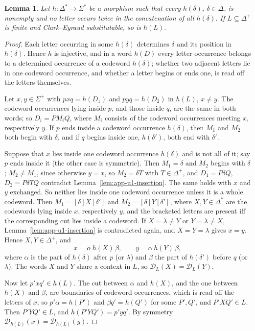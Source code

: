 \documentclass[11pt]{article}
\numberwithin{equation}{section}
\theoremstyle{plain}
\newtheorem{lemma}[theorem]{Lemma}
\theoremstyle{definition}
\theoremstyle{remark}
\theoremstyle{plain}
\newcommand{\D}{\mathcal{D}}
\newcommand{\eps}{\lambda}
\begin{document}
\begin{lemma}\label{lem:app-u1-code}
Let $h:\Delta^*\to\Sigma^*$ be a morphism such that every $h(\delta)$,
$\delta\in\Delta$, is nonempty and no letter occurs twice in the concatenation of
all $h(\delta)$.  If $L\subseteq\Delta^+$ is finite and Clark--Eyraud
substitutable, so is $h(L)$.
\end{lemma}

\begin{proof}
Each letter occurring in some $h(\delta)$ determines $\delta$ and its position in
$h(\delta)$.  Hence $h$ is injective, and in a word $h(D)$ every letter occurrence
belongs to a determined occurrence of a codeword $h(\delta)$; whether two adjacent
letters lie in one codeword occurrence, and whether a letter begins or ends one,
is read off the letters themselves.

Let $x,y\in\Sigma^+$ with $pxq=h(D_1)$ and $pyq=h(D_2)$ in $h(L)$, $x\ne y$.  The
codeword occurrences lying inside $p$, and those inside $q$, are the same in both
words; so $D_i=PM_iQ$, where $M_i$ consists of the codeword occurrences meeting
$x$, respectively $y$.  If $p$ ends inside a codeword occurrence $h(\delta)$, then
$M_1$ and $M_2$ both begin with $\delta$, and if $q$ begins inside one,
$h(\delta')$, both end with $\delta'$.

Suppose that $x$ lies inside one codeword occurrence $h(\delta)$ and is not all
of it; say $p$ ends inside it (the other case is symmetric).  Then $M_1=\delta$
and $M_2$ begins with $\delta$; $M_2\ne M_1$, since otherwise $y=x$, so
$M_2=\delta T$ with $T\in\Delta^+$, and $D_1=P\delta Q$, $D_2=P\delta TQ$ contradict
Lemma~\ref{lem:app-u1-insertion}.  The
same holds with $x$ and $y$ exchanged.  So neither lies inside one codeword
occurrence unless it is a whole codeword.  Then $M_1=[\delta]X[\delta']$ and
$M_2=[\delta]Y[\delta']$, where $X,Y\in\Delta^*$ are the codewords lying inside $x$,
respectively $y$, and the bracketed letters are present iff the corresponding
cut lies inside a codeword.  If $X=\eps\ne Y$ or $Y=\eps\ne X$,
Lemma~\ref{lem:app-u1-insertion} is contradicted again, and $X=Y=\eps$ gives
$x=y$.  Hence $X,Y\in\Delta^+$, and
\[
 x=\alpha\,h(X)\,\beta,\qquad y=\alpha\,h(Y)\,\beta,
\]
where $\alpha$ is the part of $h(\delta)$ after $p$ (or $\eps$) and $\beta$ the
part of $h(\delta')$ before $q$ (or $\eps$).  The words $X$ and $Y$ share a context
in $L$, so $\D_L(X)=\D_L(Y)$.

Now let $p'xq'\in h(L)$.  The cut between $\alpha$ and $h(X)$, and the one between
$h(X)$ and $\beta$, are boundaries of codeword occurrences, which is read off the
letters of $x$; so $p'\alpha=h(P')$ and $\beta q'=h(Q')$ for some $P',Q'$, and
$P'XQ'\in L$.  Then $P'YQ'\in L$, and $h(P'YQ')=p'yq'$.  By symmetry
$\D_{h(L)}(x)=\D_{h(L)}(y)$.
\end{proof}
\end{document}
